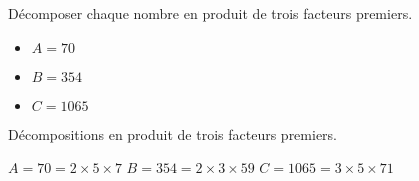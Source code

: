 \begin{exercice*}
    \label{N2exosBase013}
    Décomposer chaque nombre en produit de trois facteurs premiers.
    \begin{itemize}
        \item[] $A=70$
        \item[] $B=354$
        \item[] $C=\num{1065}$
    \end{itemize}
\end{exercice*}
\begin{corrige}
    Décompositions en produit de trois facteurs premiers.
    
    \begin{itemize}
        \def\item{}
        \item $A=70=2\times 5\times 7$
        \item $B=354=2\times 3\times 59$
        \item $C=\num{1065}=3\times 5\times 71$
    \end{itemize} 
\end{corrige}

